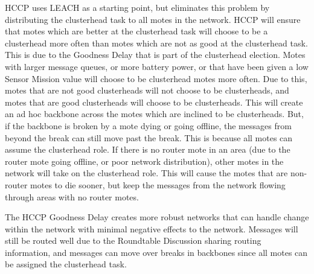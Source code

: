 HCCP uses LEACH as a starting point, but eliminates this problem by 
distributing the clusterhead task to all motes in the network. HCCP will ensure that
motes which are better at the clusterhead task will choose to be a clusterhead more often 
than motes which are not as good at the clusterhead task. This is due to the Goodness Delay that
is part of the clusterhead election. Motes with larger message queues, or more battery power,
or that have been given a low Sensor Mission value will choose to be clusterhead motes more often.
Due to this, motes that are not good clusterheads will not choose to be clusterheads,
and motes that are good clusterheads will choose to be clusterheads. This will create an 
ad hoc backbone across the motes which are inclined to be clusterheads. But, if the backbone is broken
by a mote dying or going offline, the messages from beyond the break can still move past the break. This
is because all motes can assume the clusterhead role. If there is no router mote in an area (due to the 
router mote going offline, or poor network distribution), other motes in the network will take on the 
clusterhead role. This will cause the motes that are non-router motes to die sooner, but 
keep the messages from the network flowing through areas with no router motes.

The HCCP Goodness Delay creates more robust networks that can 
handle change within the network with minimal negative effects to 
the network. Messages will still be routed well due to the 
Roundtable Discussion sharing routing information, and 
messages can move  over breaks in backbones since all motes can be assigned the clusterhead task.



